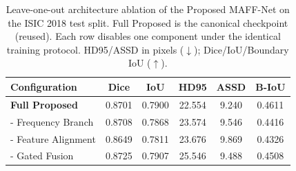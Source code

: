 \begin{table}[t]
\centering
\caption{Leave-one-out architecture ablation of the Proposed MAFF-Net on the ISIC 2018 test split. Full Proposed is the canonical checkpoint (reused). Each row disables one component under the identical training protocol. HD95/ASSD in pixels ($\downarrow$); Dice/IoU/Boundary IoU ($\uparrow$).}
\label{tab:ablation}
\begin{tabular}{lccccc}
\toprule
Configuration & Dice & IoU & HD95 & ASSD & B-IoU \\
\midrule
\textbf{Full Proposed} & 0.8701 & 0.7900 & 22.554 & 9.240 & 0.4611 \\
\midrule
- Frequency Branch & 0.8708 & 0.7868 & 23.574 & 9.546 & 0.4416 \\
- Feature Alignment & 0.8649 & 0.7811 & 23.676 & 9.869 & 0.4326 \\
- Gated Fusion & 0.8725 & 0.7907 & 25.546 & 9.488 & 0.4508 \\
\bottomrule
\end{tabular}
\end{table}
